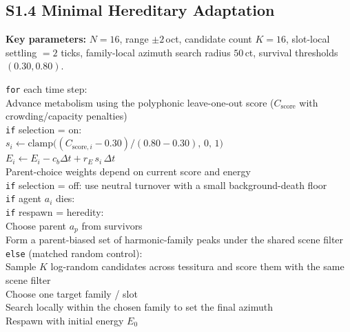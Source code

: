 \documentclass[letterpaper]{article}
\begin{document}
\subsection{S1.4 Minimal Hereditary Adaptation}

\noindent\textbf{Key parameters:} $N\!=\!16$, range $\pm 2$\,oct, candidate count $K\!=\!16$, slot-local settling $=2$ ticks, family-local azimuth search radius $50$\,ct, survival thresholds $(0.30, 0.80)$.

\smallskip
\noindent\texttt{for} each time step:\\
\hspace*{1em}Advance metabolism using the polyphonic leave-one-out score ($C_{\text{score}}$ with crowding/capacity penalties)\\
\hspace*{1em}\texttt{if} selection = on:\\
\hspace*{2em}$s_i \gets \mathrm{clamp}\!\bigl((C_{\text{score},i} - 0.30)/(0.80 - 0.30),\,0,\,1\bigr)$\\
\hspace*{2em}$E_i \gets E_i - c_b \Delta t + r_E\, s_i\, \Delta t$\\
\hspace*{2em}Parent-choice weights depend on current score and energy\\
\hspace*{1em}\texttt{if} selection = off: use neutral turnover with a small background-death floor\\
\hspace*{1em}\texttt{if} agent $a_i$ dies:\\
\hspace*{2em}\texttt{if} respawn = heredity:\\
\hspace*{3em}Choose parent $a_p$ from survivors\\
\hspace*{3em}Form a parent-biased set of harmonic-family peaks under the shared scene filter\\
\hspace*{2em}\texttt{else} (matched random control):\\
\hspace*{3em}Sample $K$ log-random candidates across tessitura and score them with the same scene filter\\
\hspace*{2em}Choose one target family / slot\\
\hspace*{2em}Search locally within the chosen family to set the final azimuth\\
\hspace*{2em}Respawn with initial energy $E_0$
\end{document}
